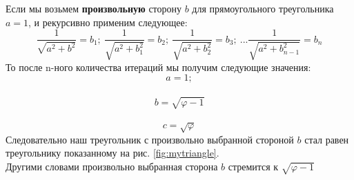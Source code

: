 \documentclass[12pt, letterpaper, oneside]{report}
\begin{document}
Если мы возьмем \textbf{произвольную} сторону $b$ для прямоугольного треугольника $a=1$, и рекурсивно применим следующее:
\begin{equation}
\dfrac{1}{\sqrt{a^2+b^2}} = b_{1}; \   \dfrac{1}{\sqrt{a^2+b_{1}^2}} = b_{2}; \   \dfrac{1}{\sqrt{a^2+b_{2}^2}}=b_{3}; \ ... \dfrac{1}{\sqrt{a^2+b_{n-1}^2}}=b_{n}
\end{equation} 
То после n-ного количества итераций мы получим следующие значения:
\begin{equation}
a=1;
\end{equation}
\\
\begin{equation}
b=\sqrt{\varphi-1}
\end{equation}
\\
\begin{equation}
c=\sqrt{\varphi}
\end{equation}
Следовательно наш треугольник с произвольно выбранной стороной $b$ стал равен треугольнику показанному на рис. \ref{fig:mytriangle}.
\\
Другими словами произвольно выбранная сторона $b$ стремится к $\sqrt{\varphi-1}$
\\

 
\newpage
\end{document}
